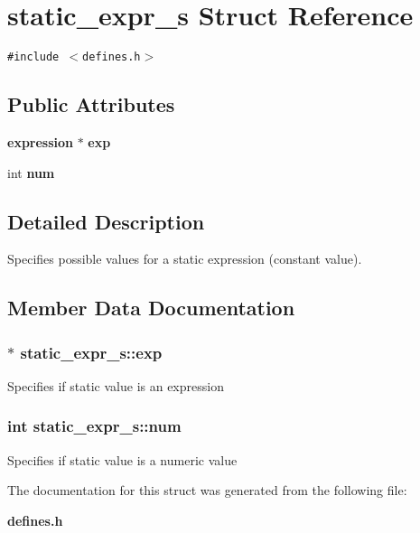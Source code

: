 \section{static\_\-expr\_\-s Struct Reference}
\label{structstatic__expr__s}
{\tt \#include $<$defines.h$>$}

\subsection*{Public Attributes}
\begin{CompactItemize}
\item 
{\bf expression} $\ast$ {\bf exp}
\item 
int {\bf num}
\end{CompactItemize}


\subsection{Detailed Description}
Specifies possible values for a static expression (constant value). 



\subsection{Member Data Documentation}
\subsubsection{$\ast$ {\bf static\_\-expr\_\-s::exp}}\label{structstatic__expr__s_o0}


Specifies if static value is an expression 
\subsubsection{\setlength{\rightskip}{0pt plus 5cm}int {\bf static\_\-expr\_\-s::num}}\label{structstatic__expr__s_o1}


Specifies if static value is a numeric value 

The documentation for this struct was generated from the following file:\begin{CompactItemize}
\item 
{\bf defines.h}\end{CompactItemize}
